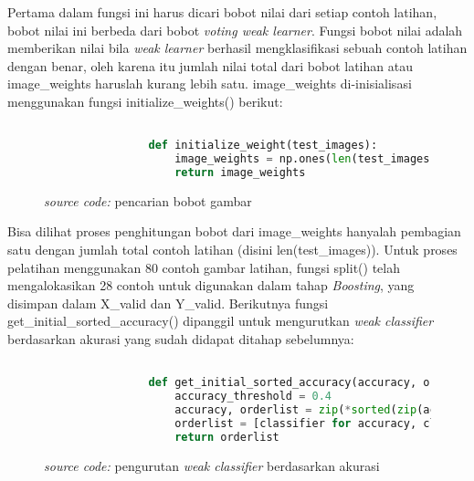 		Pertama dalam fungsi ini harus dicari bobot nilai dari setiap contoh latihan, 
		bobot nilai ini berbeda dari bobot \emph{voting weak learner}. Fungsi bobot nilai 
		adalah memberikan nilai bila \emph{weak learner} berhasil mengklasifikasi sebuah 
		contoh latihan dengan benar, oleh karena itu jumlah nilai total dari bobot 
		latihan atau image\_weights haruslah kurang lebih satu. image\_weights di-inisialisasi 
		menggunakan fungsi initialize\_weights() berikut:

		\begin{figure}[H]
			\begin{lstlisting}[language=Python, basicstyle=\tiny]

				def initialize_weight(test_images):
					image_weights = np.ones(len(test_images)) / len(test_images)
					return image_weights
			\end{lstlisting}
			\caption{\emph{source code:} pencarian bobot gambar}
			\label{code: initialize image weights}
		\end{figure}

		Bisa dilihat proses penghitungan bobot dari image\_weights hanyalah pembagian 
		satu dengan jumlah total contoh latihan (disini len(test\_images)). Untuk proses 
		pelatihan menggunakan 80 contoh gambar latihan, fungsi split() telah mengalokasikan 
		28 contoh untuk digunakan dalam tahap \emph{Boosting}, yang disimpan dalam X\_valid 
		dan Y\_valid. Berikutnya fungsi get\_initial\_sorted\_accuracy() dipanggil untuk 
		mengurutkan \emph{weak classifier} berdasarkan akurasi yang sudah didapat ditahap sebelumnya:

		\begin{figure}[H]
			\begin{lstlisting}[language=Python, basicstyle=\tiny]

				def get_initial_sorted_accuracy(accuracy, orderlist):
					accuracy_threshold = 0.4
					accuracy, orderlist = zip(*sorted(zip(accuracy, orderlist), reverse = True))
					orderlist = [classifier for accuracy, classifier in zip(accuracy, orderlist) if accuracy >= accuracy_threshold]
					return orderlist

			\end{lstlisting}
			\caption{\emph{source code:} pengurutan \emph{weak classifier} berdasarkan akurasi}
			\label{code: initial sorted accyracy}
		\end{figure}

